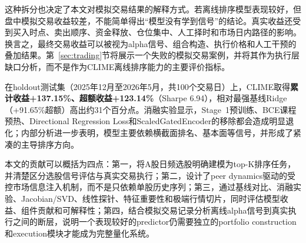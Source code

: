 这种拆分也决定了本文对模拟交易结果的解释方式。若离线排序模型表现较好，但盘中模拟交易收益较差，不能简单得出“模型没有学到信号”的结论。真实收益还受到买入时点、卖出顺序、资金释放、仓位集中、人工择时和市场日内路径的影响。换言之，最终交易收益可以被视为alpha信号、组合构造、执行价格和人工干预的叠加结果。第~\ref{sec:trading}节将展示一个失败的模拟交易案例，并将其作为执行层缺口分析，而不是作为CLIME离线排序能力的主要评价指标。

在holdout测试集（2025年12月至2026年5月，共100个交易日）上，CLIME取得\textbf{累计收益+137.15\%、超额收益+123.14\%}（Sharpe 6.94），相对最强基线Ridge（+91.65\%超额）高出约31个百分点。消融实验显示，Stage~1预训练、BCE课程预热、Directional Regression Loss和ScaledGatedEncoder的移除都会造成明显退化；内部分析进一步表明，模型主要依赖横截面排名、基本面等信号，并形成了紧凑的主导排序方向。

本文的贡献可以概括为四点：第一，将A股日频选股明确建模为top-K排序任务，并清楚区分选股信号评估与真实交易执行；第二，设计了peer dynamics驱动的受控市场信息注入机制，而不是只依赖单股历史序列；第三，通过基线对比、消融实验、Jacobian/SVD、线性探针、特征重要性和极端行情切片，同时评估模型收益、组件贡献和可解释性；第四，结合模拟交易记录分析离线alpha信号到真实执行之间的断层，说明一个表现较好的predictor仍需要独立的portfolio construction和execution模块才能成为完整量化系统。
